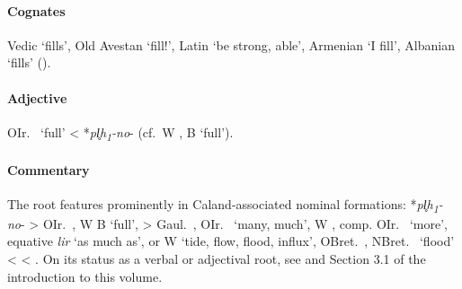\documentclass[output=paper,colorlinks,citecolor=brown]{langscibook}
\begin{document}
\paragraph*{Cognates} 

Vedic  ‘fills’, Old Avestan  ‘fill!’, Latin  ‘be strong, able’, Armenian  ‘I fill’, Albanian  ‘fills’ ().

\paragraph*{Adjective} OIr.\   ‘full’ < *\textit{pl̥h\textsubscript{1}-no}-  (cf.\ W , B  ‘full’).

\paragraph*{Commentary}

The root features prominently in Caland-associated  nominal formations:  *\textit{pl̥h\textsubscript{1}-no}- > OIr.\  , W  B  ‘full’,  > Gaul.\ , OIr.\   ‘many, much’, W , comp. OIr.\   ‘more’, equative \textit{lir} ‘as much as’, or W  ‘tide, flow, flood, influx’, OBret.\  , NBret.\  ‘flood’ <  < . On its status as a verbal or adjectival root, see \citet[208, n.\ 7]{Nussbaum2022} and Section 3.1 of the introduction to this volume. 
\end{document}
